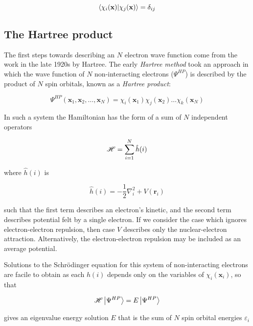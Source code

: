 \begin{equation}
\bra{\chi_i(\mathbf{x})}\ket{\chi_j(\mathbf{x})} = \delta_{ij}
\end{equation}

\subsection{The Hartree product}

The first steps towards describing an $N$ electron wave function come from the work in the late 1920s by Hartree. The early \emph{Hartree method} took an approach in which the wave function of $N$ non-interacting electrons ($\Psi^{HP}$) is described by the product of $N$ spin orbitals, known as a \emph{Hartree product}:

\begin{equation}
\Psi^{HP}(\mathbf{x}_1,\mathbf{x}_2,\ldots,\mathbf{x}_N) = \chi_i(\mathbf{x}_1)\chi_j(\mathbf{x}_2)\dots\chi_k(\mathbf{x}_N)
\end{equation}

\noindent In such a system the Hamiltonian has the form of a sum of $N$ independent operators

\begin{equation}
  \mathscr{H} = \sum_{i=1}^N \hat{h}(i)
\end{equation}

\noindent where $\hat{h}(i)$ is

\begin{equation}
  \hat{h}(i) = -\frac{1}{2} \nabla_i^2 + V(\mathbf{r}_i)
\end{equation}

\noindent such that the first term describes an electron's kinetic, and the second term describes potential felt by a single electron. If we consider the case which ignores electron-electron repulsion, then case $V$ describes only the nuclear-electron attraction. Alternatively, the electron-electron repulsion may be included as an average potential.

Solutions to the Schr{\"o}dinger equation for this system of non-interacting electrons are facile to obtain as each $h(i)$ depends only on the variables of $\chi_i(\mathbf{x}_i)$, so that

\begin{equation}
  \mathscr{H} \ket{\Psi^{HP}} = E \ket{\Psi^{HP}}
\end{equation}

\noindent gives an eigenvalue energy solution $E$ that is the sum of $N$ spin orbital energies $\varepsilon_i$

